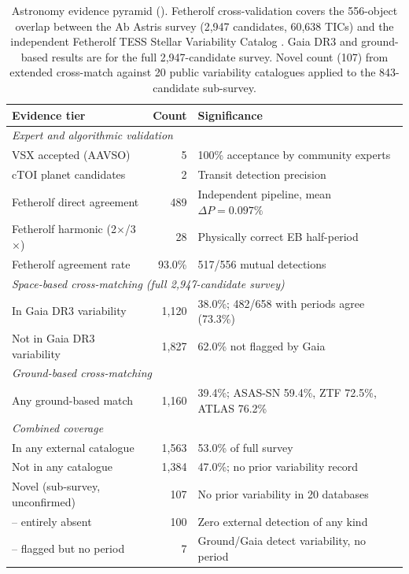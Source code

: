 \documentclass[11pt,a4paper]{article}
\begin{document}
\begin{table}[htbp]
\centering
\caption{Astronomy evidence pyramid (). Fetherolf cross-validation covers the 556-object overlap between the Ab Astris survey (2{,}947 candidates, 60{,}638 TICs) and the independent Fetherolf TESS Stellar Variability Catalog \citep{Fetherolf2023}. Gaia DR3 and ground-based results are for the full 2{,}947-candidate survey. Novel count (107) from extended cross-match against 20 public variability catalogues applied to the 843-candidate sub-survey.}
\label{tab:astro}
\smallskip
\begin{tabular}{lrl}
\toprule
\textbf{Evidence tier} & \textbf{Count} & \textbf{Significance} \\
\midrule
\multicolumn{3}{l}{\textit{Expert and algorithmic validation}} \\
VSX accepted (AAVSO)                & 5     & 100\% acceptance by community experts \\
cTOI planet candidates              & 2     & Transit detection precision \\
Fetherolf direct agreement          & 489   & Independent pipeline, mean $\Delta P = 0.097\%$ \\
Fetherolf harmonic (2$\times$/3$\times$) & 28 & Physically correct EB half-period \\
Fetherolf agreement rate            & 93.0\%& 517/556 mutual detections \\
\midrule
\multicolumn{3}{l}{\textit{Space-based cross-matching (full 2,947-candidate survey)}} \\
In Gaia DR3 variability             & 1{,}120 & 38.0\%; 482/658 with periods agree (73.3\%) \\
Not in Gaia DR3 variability         & 1{,}827 & 62.0\% not flagged by Gaia \\
\midrule
\multicolumn{3}{l}{\textit{Ground-based cross-matching}} \\
Any ground-based match              & 1{,}160 & 39.4\%; ASAS-SN 59.4\%, ZTF 72.5\%, ATLAS 76.2\% \\
\midrule
\multicolumn{3}{l}{\textit{Combined coverage}} \\
In any external catalogue           & 1{,}563 & 53.0\% of full survey \\
Not in any catalogue                & 1{,}384 & 47.0\%; no prior variability record \\
Novel (sub-survey, unconfirmed)     & 107   & No prior variability in 20 databases \\
\quad -- entirely absent            & 100   & Zero external detection of any kind \\
\quad -- flagged but no period      &   7   & Ground/Gaia detect variability, no period \\
\bottomrule
\end{tabular}
\end{table}
\end{document}
